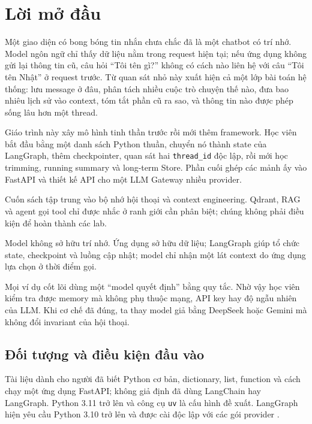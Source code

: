 \chapter*{Lời mở đầu}

Một giao diện có bong bóng tin nhắn chưa chắc đã là một chatbot có trí nhớ. Model ngôn ngữ chỉ
thấy dữ liệu nằm trong request hiện tại; nếu ứng dụng không gửi lại thông tin cũ, câu hỏi
``Tôi tên gì?'' không có cách nào liên hệ với câu ``Tôi tên Nhật'' ở request trước. Từ quan sát
nhỏ này xuất hiện cả một lớp bài toán hệ thống: lưu message ở đâu, phân tách nhiều cuộc trò
chuyện thế nào, đưa bao nhiêu lịch sử vào context, tóm tắt phần cũ ra sao, và thông tin nào được
phép sống lâu hơn một thread.

Giáo trình này xây mô hình tinh thần trước rồi mới thêm framework. Học viên bắt đầu bằng một
danh sách Python thuần, chuyển nó thành state của LangGraph, thêm checkpointer, quan sát hai
\texttt{thread\_id} độc lập, rồi mới học trimming, running summary và long-term Store. Phần cuối
ghép các mảnh ấy vào FastAPI và thiết kế API cho một LLM Gateway nhiều provider.

\begin{aidefinition}[Phạm vi]
Cuốn sách tập trung vào bộ nhớ hội thoại và context engineering. Qdrant, RAG và agent gọi tool
chỉ được nhắc ở ranh giới cần phân biệt; chúng không phải điều kiện để hoàn thành các lab.
\end{aidefinition}

\begin{aiintuition}
Model không sở hữu trí nhớ. Ứng dụng sở hữu dữ liệu; LangGraph giúp tổ chức state, checkpoint
và luồng cập nhật; model chỉ nhận một lát context do ứng dụng lựa chọn ở thời điểm gọi.
\end{aiintuition}

Mọi ví dụ cốt lõi dùng một ``model quyết định'' bằng quy tắc. Nhờ vậy học viên kiểm tra được
memory mà không phụ thuộc mạng, API key hay độ ngẫu nhiên của LLM. Khi cơ chế đã đúng, ta thay
model giả bằng DeepSeek hoặc Gemini mà không đổi invariant của hội thoại.

\section*{Đối tượng và điều kiện đầu vào}

Tài liệu dành cho người đã biết Python cơ bản, dictionary, list, function và cách chạy một ứng
dụng FastAPI; không giả định đã dùng LangChain hay LangGraph. Python 3.11 trở lên và công cụ
\texttt{uv} là cấu hình đề xuất. LangGraph hiện yêu cầu Python 3.10 trở lên và được cài độc lập
với các gói provider \parencite{langgraphInstall}.


